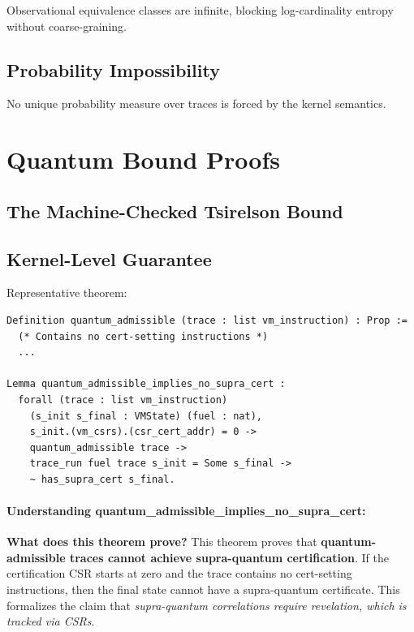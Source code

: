 Observational equivalence classes are infinite, blocking log-cardinality entropy without coarse-graining.

\subsection{Probability Impossibility}

No unique probability measure over traces is forced by the kernel semantics.

\section{Quantum Bound Proofs}


\subsection{The Machine-Checked Tsirelson Bound}


\subsection{Kernel-Level Guarantee}

Representative theorem:
\begin{lstlisting}
Definition quantum_admissible (trace : list vm_instruction) : Prop :=
  (* Contains no cert-setting instructions *)
  ...

Lemma quantum_admissible_implies_no_supra_cert :
  forall (trace : list vm_instruction)
    (s_init s_final : VMState) (fuel : nat),
    s_init.(vm_csrs).(csr_cert_addr) = 0 ->
    quantum_admissible trace ->
    trace_run fuel trace s_init = Some s_final ->
    ~ has_supra_cert s_final.
\end{lstlisting}

\paragraph{Understanding quantum\_admissible\_implies\_no\_supra\_cert:}

\textbf{What does this theorem prove?} This theorem proves that \textbf{quantum-admissible traces cannot achieve supra-quantum certification}. If the certification CSR starts at zero and the trace contains no cert-setting instructions, then the final state cannot have a supra-quantum certificate. This formalizes the claim that \textit{supra-quantum correlations require revelation, which is tracked via CSRs}.

